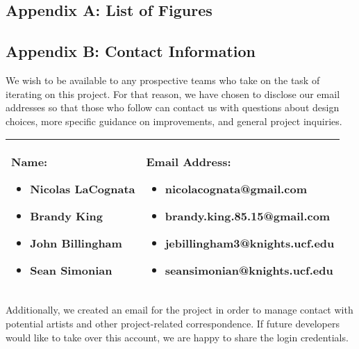 \subsection{Appendix A: List of Figures}
{
\setlength{\parskip}{0em}
\listoffigures
}

\newpage
\subsection{Appendix B: Contact Information}
We wish to be available to any prospective teams who take on the task of iterating on this project. For that reason, we have chosen to disclose our email addresses so that those who follow can contact us with questions about design choices, more specific guidance on improvements, and general project inquiries. \\

\begin{center}
    \begin{tabular}{| m{5cm} | m{9cm} |} 
        \hline
            \textbf{Name:} 
            \begin{itemize}
                \setlength\itemsep{-.35em}
                \item Nicolas LaCognata
                \item Brandy King
                \item John Billingham
                \item Sean Simonian
            \end{itemize}& 
            \textbf{Email Address:} 
            \begin{itemize}
                \setlength\itemsep{-.35em}
                \item nicolacognata@gmail.com
                \item brandy.king.85.15@gmail.com
                \item jebillingham3@knights.ucf.edu
                \item seansimonian@knights.ucf.edu
            \end{itemize}
            \\
        \hline
    \end{tabular}
\end{center}

Additionally, we created an email for the project in order to manage contact with potential artists and other project-related correspondence. If future developers would like to take over this account, we are happy to share the login credentials.\\